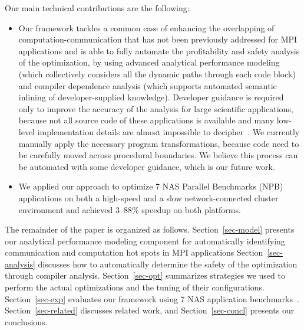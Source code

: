 Our main technical contributions are the following:

\begin{itemize}

\item Our framework tackles a common case of enhancing the overlapping of computation-communication that has not been previously addressed for MPI applications and
is able to fully automate the profitability and safety analysis of the optimization, by using advanced analytical performance
modeling (which collectively considers all the dynamic paths through each code block) and compiler dependence analysis
(which supports automated semantic inlining of developer-supplied knowledge). Developer guidance is required only to improve the
accuracy of the analysis for large scientific applications, because not all source code
of these applications is available and many low-level implementation details are almost impossible to decipher~\cite{POET:ICPP11}.
 We currently manually apply the necessary program transformations,
  because code need to be carefully moved across procedural boundaries. We believe this process can be automated with some developer
guidance, which is our future work.

\item We applied our approach to optimize 7 NAS Parallel Benchmarks
  (NPB) applications on both a high-speed and a slow network-connected
  cluster environment and achieved 3--88\% speedup on both platforms.

\end{itemize}


The remainder of the paper is organized as follows.
Section~\ref{sec-model} presents our analytical performance modeling
component for automatically identifying communication and computation
hot spots in MPI applications Section~\ref{sec-analysis} discusses how
to automatically determine the safety of the optimization through
compiler analysis.  Section~\ref{sec-opt} summarizes strategies we
used to perform the actual optimizations and the tuning of their
configurations.  Section~\ref{sec-exp} evaluates our framework using 7
NAS application benchmarks~\cite{npb}.  Section~\ref{sec-related}
discusses related work, and Section~\ref{sec-concl} presents our
conclusions.
